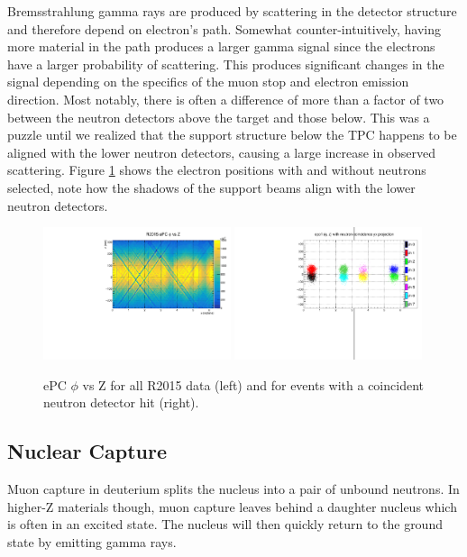 Bremsstrahlung gamma rays are produced by scattering in the detector structure and therefore depend on electron's path.
Somewhat counter-intuitively, having more material in the path produces a larger gamma signal since the electrons have a larger probability of scattering.
This produces significant changes in the signal depending on the specifics of the muon stop and electron emission direction.  
Most notably, there is often a difference of more than a factor of two between the neutron detectors above the target and those below.
This was a puzzle until we realized that the support structure below the TPC happens to be aligned with the lower neutron detectors, causing a large increase in observed scattering. 
Figure \ref{fig:epc_phi_z} shows the electron positions with and without neutrons selected, note how the shadows of the support beams align with the lower neutron detectors.

\begin{figure}[h]
  \includegraphics[width=0.49\textwidth]{neutrons/figures/ePC_phi_Z_All.pdf}
  \includegraphics[width=0.49\textwidth]{neutrons/figures/ePC_phi_Z_Neu_Tagged.pdf}
  \caption{ePC $\phi$ vs Z for all R2015 data (left) and for events with a coincident neutron detector hit (right).}
  \label{fig:epc_phi_z}
\end{figure}

\subsection{Nuclear Capture}

Muon capture in deuterium splits the nucleus into a pair of unbound neutrons.
In higher-Z materials though, muon capture leaves behind a daughter nucleus which is often in an excited state.  
The nucleus will then quickly return to the ground state by emitting gamma rays.

